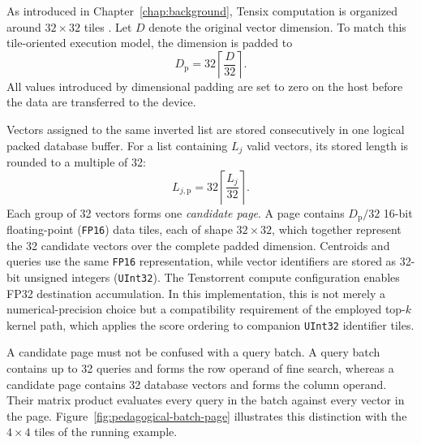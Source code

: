 As introduced in Chapter~\ref{chap:background}, Tensix computation is organized around \(32\times32\) tiles \cite{tenstorrent_metalium_architecture}. Let \(D\) denote the original vector dimension. To match this tile-oriented execution model, the dimension is padded to
\begin{equation}
D_{\mathrm{p}}=32\left\lceil\frac{D}{32}\right\rceil.
\label{eq:dimension-padding}
\end{equation}
All values introduced by dimensional padding are set to zero on the host before the data are transferred to the device.

Vectors assigned to the same inverted list are stored consecutively in one logical packed database buffer. For a list containing \(L_j\) valid vectors, its stored length is rounded to a multiple of 32:
\begin{equation}
L_{j,\mathrm{p}}=32\left\lceil\frac{L_j}{32}\right\rceil.
\label{eq:list-padding}
\end{equation}
Each group of 32 vectors forms one \emph{candidate page}. A page contains \(D_{\mathrm{p}}/32\) 16-bit floating-point (\texttt{FP16}) data tiles, each of shape \(32\times32\), which together represent the 32 candidate vectors over the complete padded dimension. Centroids and queries use the same \texttt{FP16} representation, while vector identifiers are stored as 32-bit unsigned integers (\texttt{UInt32}). The Tenstorrent compute configuration enables FP32 destination accumulation. In this implementation, this is not merely a numerical-precision choice but a compatibility requirement of the employed top-\(k\) kernel path, which applies the score ordering to companion \texttt{UInt32} identifier tiles.

A candidate page must not be confused with a query batch. A query batch contains up to 32 queries and forms the row operand of fine search, whereas a candidate page contains 32 database vectors and forms the column operand. Their matrix product evaluates every query in the batch against every vector in the page. Figure~\ref{fig:pedagogical-batch-page} illustrates this distinction with the \(4\times4\) tiles of the running example.


